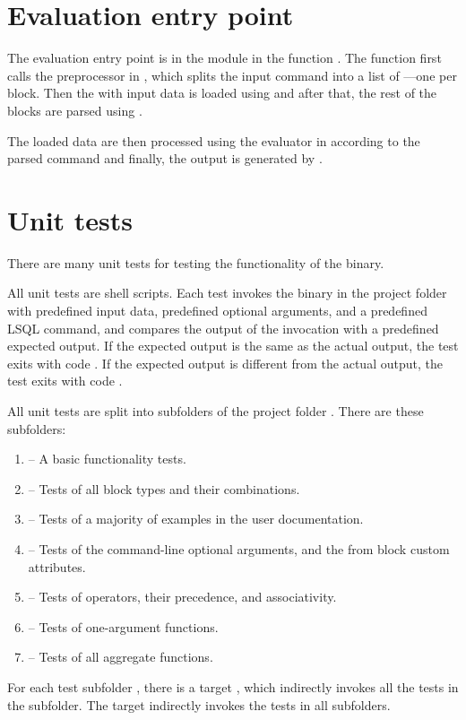 \section{Evaluation entry point}
The evaluation entry point is in the module  in the function . 
The function first calls the preprocessor in , which splits the input command into a list of ---one  per block. 
Then the  with input data is loaded using  and after that,
the rest of the blocks are parsed using . 

The loaded data are then processed using the evaluator in
 according to the parsed command and finally, the output is generated by .


\section{Unit tests}
There are many unit tests for testing the functionality of the  binary.

All unit tests are shell scripts. Each test invokes the  binary in the  project folder
with predefined input data, predefined optional arguments, and a predefined LSQL command, and compares
the output of the  invocation with a predefined expected output.
If the expected output is the same as the actual output, the test exits with code . 
If the expected output is different from the actual output, the test exits with code . 

All unit tests are split into subfolders of the project folder .
There are these subfolders:
\begin{enumerate}
    \item {} -- A basic functionality tests.
    \item {} -- Tests of all block types and their combinations.
    \item {} -- Tests of a majority of examples in the user documentation.
    \item {} -- Tests of the command-line optional arguments, and the from block custom attributes.
    \item {} -- Tests of operators, their precedence, and associativity.
    \item {} -- Tests of one-argument functions.
    \item {} -- Tests of all aggregate functions.
\end{enumerate}

For each test subfolder , there is a  target , which indirectly invokes all the tests in the subfolder. 
The  target  indirectly invokes the tests in all subfolders.
